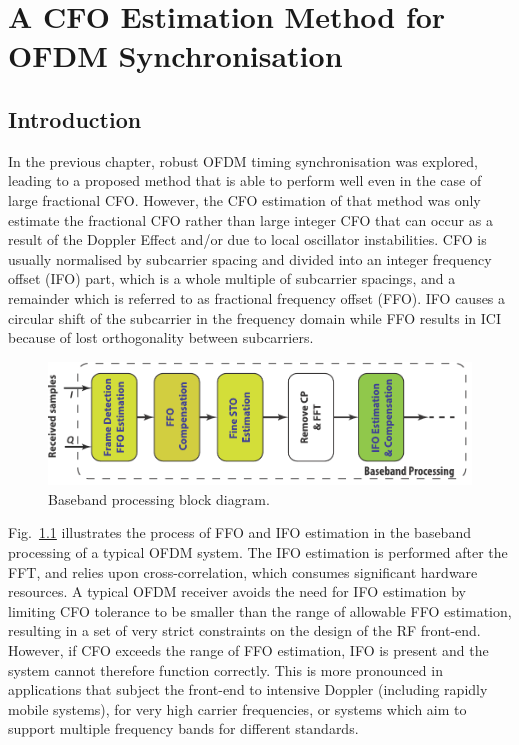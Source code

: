 \chapter{A CFO Estimation Method for OFDM Synchronisation}
\label{chap:CFO}

\section{Introduction}
In the previous chapter, robust OFDM timing synchronisation was explored, leading to a proposed method that is able to perform well even in the case of large fractional CFO.
However, the CFO estimation of that method was only estimate the fractional CFO rather than large integer CFO that can occur as a result of the Doppler Effect and/or due to local oscillator instabilities.
CFO is usually normalised by subcarrier spacing and divided into an integer frequency offset (IFO) part, which is a whole multiple of subcarrier spacings, and a remainder which is referred to as fractional frequency offset (FFO). 
IFO causes a circular shift of the subcarrier in the frequency domain while FFO results in ICI because of lost orthogonality between subcarriers.
\begin{figure}[b]
    \centerline{\includegraphics [width=0.9\columnwidth] {figures/Baseband.pdf} }
    \caption{Baseband processing block diagram.}
    \label{fig:baseband}
\end{figure}
Fig.~\ref{fig:baseband} illustrates the process of FFO and IFO estimation in the baseband processing of a typical OFDM system. 
The IFO estimation is performed after the FFT, and relies upon cross-correlation, which consumes significant hardware resources. 
A typical OFDM receiver avoids the need for IFO estimation by limiting CFO tolerance to be smaller than the range of allowable FFO estimation, resulting in a set of very strict constraints on the design of the RF front-end. However, if CFO exceeds the range of FFO estimation, IFO is present and the system cannot therefore function correctly. 
This is more pronounced in applications that subject the front-end to intensive Doppler (including rapidly mobile systems), for very high carrier frequencies, or systems which aim to support multiple frequency bands for different standards.

